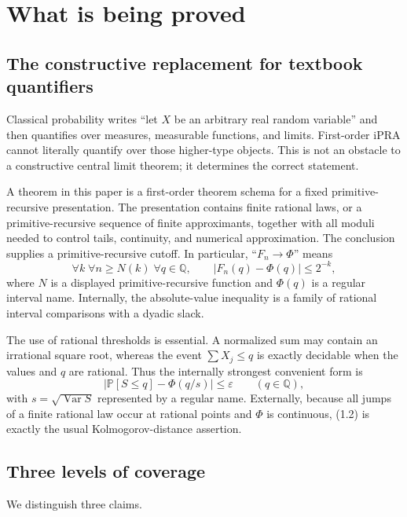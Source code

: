 \documentclass[11pt]{article}
\newcommand{\Q}{\mathbb Q}
\newcommand{\Pp}{\mathbb P}
\newcommand{\Var}{\operatorname{Var}}
\newcommand{\PhiN}{\Phi}
\newcommand{\abs}[1]{\left|#1\right|}
\newcommand{\ipra}{\mathrm{iPRA}}
\begin{document}
\tableofcontents
\newpage

\section{What is being proved}

\subsection{The constructive replacement for textbook quantifiers}

Classical probability writes ``let \(X\) be an arbitrary real random
variable'' and then quantifies over measures, measurable functions, and
limits.  First-order \(\ipra\) cannot literally quantify over those
higher-type objects.  This is not an obstacle to a constructive central limit
theorem; it determines the correct statement.

A theorem in this paper is a first-order theorem schema for a fixed
primitive-recursive presentation.  The presentation contains finite rational
laws, or a primitive-recursive sequence of finite approximants, together with
all moduli needed to control tails, continuity, and numerical approximation.
The conclusion supplies a primitive-recursive cutoff.  In particular,
``\(F_n\to\PhiN\)'' means
\[
 \forall k\;\forall n\ge N(k)\;\forall q\in\Q,
 \qquad \abs{F_n(q)-\PhiN(q)}\le 2^{-k},                 \tag{1.1}
\]
where \(N\) is a displayed primitive-recursive function and \(\PhiN(q)\) is
a regular interval name.  Internally, the absolute-value inequality is a
family of rational interval comparisons with a dyadic slack.

The use of rational thresholds is essential.  A normalized sum may contain an
irrational square root, whereas the event
\(\sum X_j\le q\) is exactly decidable when the values and \(q\) are rational.
Thus the internally strongest convenient form is
\[
 \abs{\Pp[S\le q]-\PhiN(q/s)}\le\varepsilon
 \qquad(q\in\Q),                                      \tag{1.2}
\]
with \(s=\sqrt{\Var S}\) represented by a regular name.  Externally, because
all jumps of a finite rational law occur at rational points and \(\PhiN\) is
continuous, (1.2) is exactly the usual Kolmogorov-distance assertion.

\subsection{Three levels of coverage}

We distinguish three claims.
\end{document}
